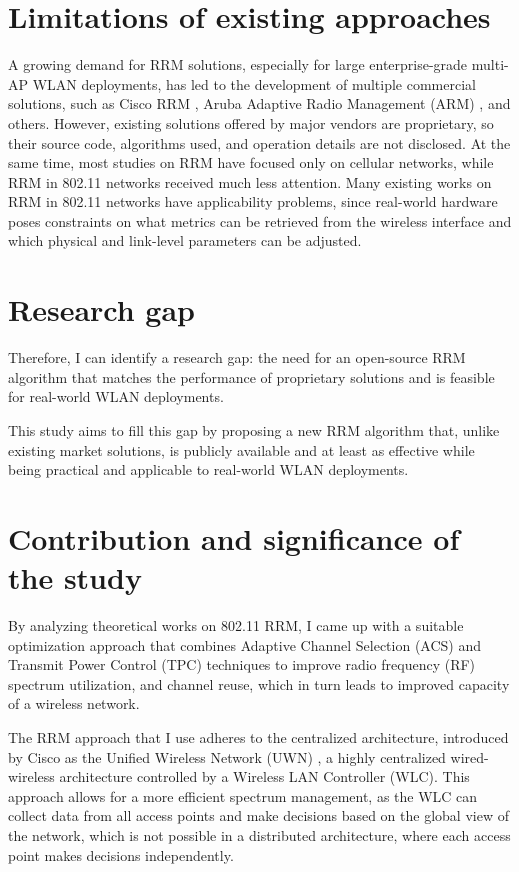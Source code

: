 \section{Limitations of existing approaches}
A growing demand for RRM solutions, especially for large enterprise-grade multi-AP WLAN deployments, has led to the development of multiple commercial solutions, such as Cisco RRM \cite{ciscoRadioResourceManagement}, Aruba Adaptive Radio Management (ARM) \cite{UnderstandingARM}, and others. However, existing solutions offered by major vendors are proprietary, so their source code, algorithms used, and operation details are not disclosed.
At the same time, most studies on RRM have focused only on cellular networks, while RRM in 802.11 networks received much less attention. Many existing works on RRM in 802.11 networks have applicability problems, since real-world hardware poses constraints on what metrics can be retrieved from the wireless interface and which physical and link-level parameters can be adjusted.

\section{Research gap}
Therefore, I can identify a research gap: the need for an open-source RRM algorithm that matches the performance of proprietary solutions and is feasible for real-world WLAN deployments.

This study aims to fill this gap by proposing a new RRM algorithm that, unlike existing market solutions, is publicly available and at least as effective while being practical and applicable to real-world WLAN deployments.

\section{Contribution and significance of the study}
By analyzing theoretical works on 802.11 RRM, I came up with a suitable optimization approach that combines Adaptive Channel Selection (ACS) and Transmit Power Control (TPC) techniques to improve radio frequency (RF) spectrum utilization, and channel reuse, which in turn leads to improved capacity of a wireless network.

The RRM approach that I use adheres to the centralized architecture, introduced by Cisco as the Unified Wireless Network (UWN) \cite{CiscoUnifiedWirelessa}, a highly centralized wired-wireless architecture controlled by a Wireless LAN Controller (WLC). This approach allows for a more efficient spectrum management, as the WLC can collect data from all access points and make decisions based on the global view of the network, which is not possible in a distributed architecture, where each access point makes decisions independently.

